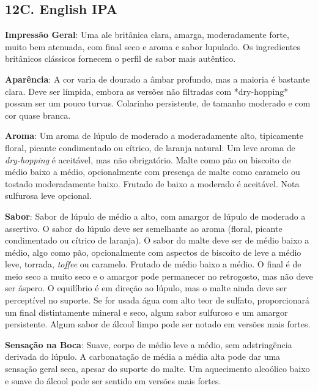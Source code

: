 \subsection*{12C. English IPA}

\textbf{Impressão Geral}: Uma ale britânica clara, amarga, moderadamente forte, muito bem atenuada, com final seco e aroma e sabor lupulado. Os ingredientes britânicos clássicos fornecem o perfil de sabor mais autêntico.

\textbf{Aparência}: A cor varia de dourado a âmbar profundo, mas a maioria é bastante clara. Deve ser límpida, embora as versões não filtradas com *dry-hopping* possam ser um pouco turvas. Colarinho persistente, de tamanho moderado e com cor quase branca.

\textbf{Aroma}: Um aroma de lúpulo de moderado a moderadamente alto, tipicamente floral, picante condimentado ou cítrico, de laranja natural. Um leve aroma de \textit{dry-hopping} é aceitável, mas não obrigatório. Malte como pão ou biscoito de médio baixo a médio, opcionalmente com presença de malte como caramelo ou tostado moderadamente baixo. Frutado de baixo a moderado é aceitável. Nota sulfurosa leve opcional.

\textbf{Sabor}: Sabor de lúpulo de médio a alto, com amargor de lúpulo de moderado a assertivo. O sabor do lúpulo deve ser semelhante ao aroma (floral, picante condimentado ou cítrico de laranja). O sabor do malte deve ser de médio baixo a médio, algo como pão, opcionalmente com aspectos de biscoito de leve a médio leve, torrada, \textit{toffee} ou caramelo. Frutado de médio baixo a médio. O final é de meio seco a muito seco e o amargor pode permanecer no retrogosto, mas não deve ser áspero. O equilíbrio é em direção ao lúpulo, mas o malte ainda deve ser perceptível no suporte. Se for usada água com alto teor de sulfato, proporcionará um final distintamente mineral e seco, algum sabor sulfuroso e um amargor persistente. Algum sabor de álcool limpo pode ser notado em versões mais fortes.

\textbf{Sensação na Boca}: Suave, corpo de médio leve a médio, sem adstringência derivada do lúpulo. A carbonatação de média a média alta pode dar uma sensação geral seca, apesar do suporte do malte. Um aquecimento alcoólico baixo e suave do álcool pode ser sentido em versões mais fortes.

